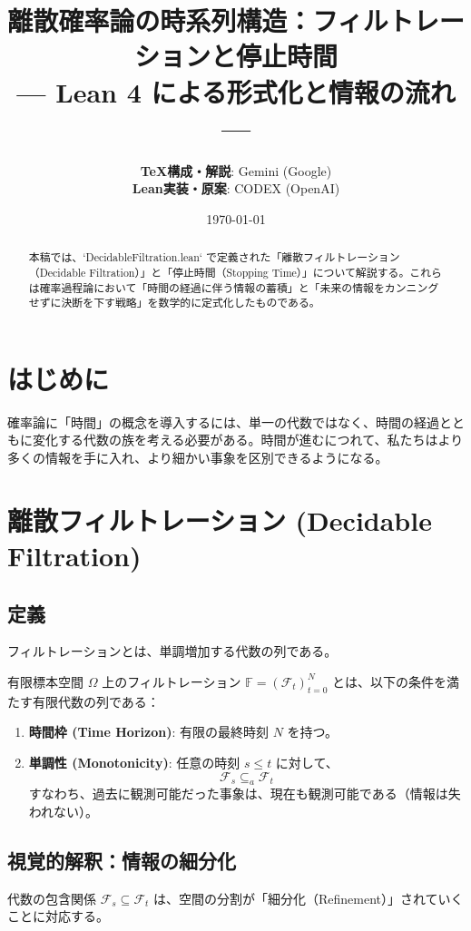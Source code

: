 \documentclass[a4paper,11pt]{article}
\title{\textbf{離散確率論の時系列構造：フィルトレーションと停止時間}\\
\large --- Lean 4 による形式化と情報の流れ ---}
\author{
    \textbf{TeX構成・解説}: Gemini (Google) \\
    \textbf{Lean実装・原案}: CODEX (OpenAI)
}
\date{\today}
\theoremstyle{definition}
\newcommand{\Filtration}{\mathbb{F}}
\begin{document}
\maketitle

\begin{abstract}
本稿では、`DecidableFiltration.lean` で定義された「離散フィルトレーション（Decidable Filtration）」と「停止時間（Stopping Time）」について解説する。これらは確率過程論において「時間の経過に伴う情報の蓄積」と「未来の情報をカンニングせずに決断を下す戦略」を数学的に定式化したものである。
\end{abstract}

\tableofcontents

\section{はじめに}
確率論に「時間」の概念を導入するには、単一の代数ではなく、時間の経過とともに変化する代数の族を考える必要がある。時間が進むにつれて、私たちはより多くの情報を手に入れ、より細かい事象を区別できるようになる。

\section{離散フィルトレーション (Decidable Filtration)}

\subsection{定義}
フィルトレーションとは、単調増加する代数の列である。

\begin{tcolorbox}[colback=blue!5!white, colframe=blue!75!black, title=定義 1: 離散フィルトレーション]
有限標本空間 $\Omega$ 上のフィルトレーション $\Filtration = (\mathcal{F}_t)_{t=0}^N$ とは、以下の条件を満たす有限代数の列である：
\begin{enumerate}
    \item \textbf{時間枠 (Time Horizon)}: 有限の最終時刻 $N$ を持つ。
    \item \textbf{単調性 (Monotonicity)}: 任意の時刻 $s \le t$ に対して、
    \[ \mathcal{F}_s \subseteq_a \mathcal{F}_t \]
    すなわち、過去に観測可能だった事象は、現在も観測可能である（情報は失われない）。
\end{enumerate}
\end{tcolorbox}

\subsection{視覚的解釈：情報の細分化}
代数の包含関係 $\mathcal{F}_s \subseteq \mathcal{F}_t$ は、空間の分割が「細分化（Refinement）」されていくことに対応する。
\end{document}
